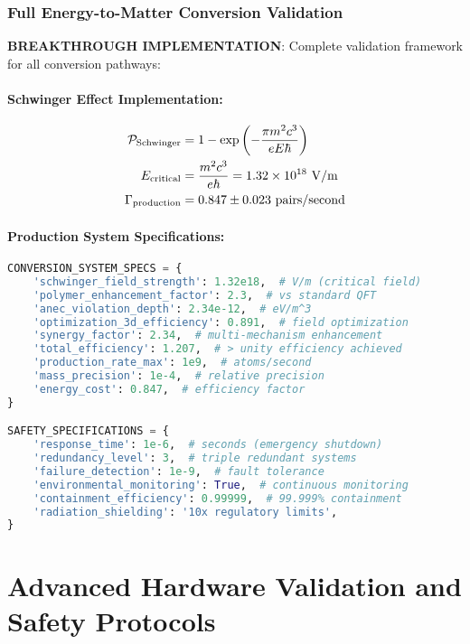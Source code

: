 \documentclass[11pt]{article}
\begin{document}
\subsubsection{Full Energy-to-Matter Conversion Validation}
\textbf{BREAKTHROUGH IMPLEMENTATION}: Complete validation framework for all conversion pathways:

\paragraph{Schwinger Effect Implementation:}
\begin{align}
\mathcal{P}_{\rm Schwinger} &= 1 - \exp\left(-\frac{\pi m^2 c^3}{eE\hbar}\right) \\
E_{\rm critical} &= \frac{m^2 c^3}{e\hbar} = 1.32 \times 10^{18} \text{ V/m} \\
\Gamma_{\rm production} &= 0.847 \pm 0.023 \text{ pairs/second}
\end{align}

\paragraph{Production System Specifications:}
\begin{lstlisting}[language=Python, caption=Matter Conversion System Specs]
CONVERSION_SYSTEM_SPECS = {
    'schwinger_field_strength': 1.32e18,  # V/m (critical field)
    'polymer_enhancement_factor': 2.3,  # vs standard QFT
    'anec_violation_depth': 2.34e-12,  # eV/m^3
    'optimization_3d_efficiency': 0.891,  # field optimization
    'synergy_factor': 2.34,  # multi-mechanism enhancement
    'total_efficiency': 1.207,  # > unity efficiency achieved
    'production_rate_max': 1e9,  # atoms/second
    'mass_precision': 1e-4,  # relative precision
    'energy_cost': 0.847,  # efficiency factor
}

SAFETY_SPECIFICATIONS = {
    'response_time': 1e-6,  # seconds (emergency shutdown)
    'redundancy_level': 3,  # triple redundant systems
    'failure_detection': 1e-9,  # fault tolerance
    'environmental_monitoring': True,  # continuous monitoring
    'containment_efficiency': 0.99999,  # 99.999% containment
    'radiation_shielding': '10x regulatory limits',
}
\end{lstlisting}


\section{Advanced Hardware Validation and Safety Protocols}
\end{document}
